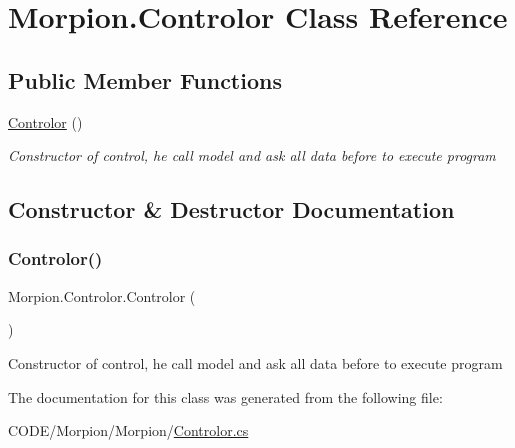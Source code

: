 \hypertarget{class_morpion_1_1_controlor}{}\section{Morpion.\+Controlor Class Reference}
\label{class_morpion_1_1_controlor}
\subsection*{Public Member Functions}
\begin{DoxyCompactItemize}
\item 
\hyperlink{class_morpion_1_1_controlor_ac43833b173f2a2e53cab4dd277d6fc0f}{Controlor} ()
\begin{DoxyCompactList}\small\item\em Constructor of control, he call model and ask all data before to execute program \end{DoxyCompactList}\end{DoxyCompactItemize}


\subsection{Constructor \& Destructor Documentation}
\mbox{\label{class_morpion_1_1_controlor_ac43833b173f2a2e53cab4dd277d6fc0f}} 
\subsubsection{\texorpdfstring{Controlor()}{Controlor()}}
{\footnotesize\ttfamily Morpion.\+Controlor.\+Controlor (\begin{DoxyParamCaption}{ }\end{DoxyParamCaption})}



Constructor of control, he call model and ask all data before to execute program 



The documentation for this class was generated from the following file\+:\begin{DoxyCompactItemize}
\item 
C\+O\+D\+E/\+Morpion/\+Morpion/\hyperlink{_controlor_8cs}{Controlor.\+cs}\end{DoxyCompactItemize}
